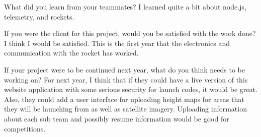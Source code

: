 \documentclass[10pt,draftclsnofoot,onecolumn]{IEEEtran}
\begin{document}
\begin{itemize}
	What did you learn from your teammates? I learned quite a bit about node.js, telemetry, and rockets.

	If you were the client for this project, would you be satisfied with the work done? I think I would be satisfied. This is the first year that the electronics and communication with the rocket has worked.

	If your project were to be continued next year, what do you think needs to be working on? For next year, I think that if they could have a live version of this website application with some serious security for launch codes, it would be great. Also, they could add a user interface for uploading height maps for areas that they will be launching from as well as satellite imagery. Uploading information about each sub team and possibly resume information would be good for competitions.
\end{itemize}
\end{document}
